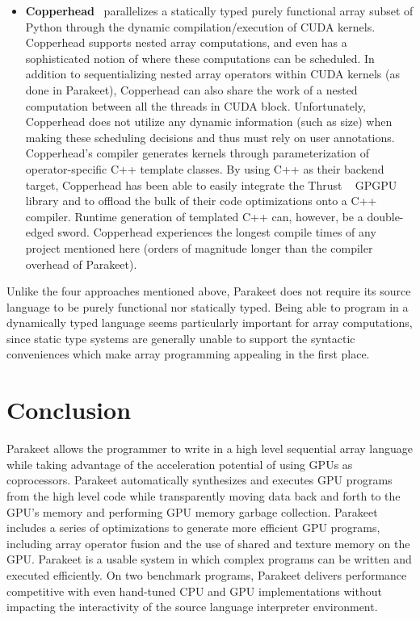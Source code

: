 \documentclass[preprint]{sigplanconf}
\begin{document}
\begin{itemize}
\item \textbf{Copperhead}~\cite{Cata11} parallelizes a statically typed purely functional array subset of Python through the dynamic compilation/execution of CUDA kernels. Copperhead supports nested array computations, and even has a sophisticated notion of where these computations can be scheduled. In addition
to sequentializing nested array operators within CUDA kernels (as done in Parakeet), Copperhead can also share the work of a nested computation between all the threads in CUDA block. Unfortunately, Copperhead does not utilize any dynamic information (such as size) when making these scheduling decisions and
thus must rely on user annotations. Copperhead's compiler generates kernels through parameterization of operator-specific C++ template classes. By using C++ as their backend target, Copperhead has been able to easily integrate the Thrust ~\cite{Hobe10} GPGPU library and to offload the bulk of their code optimizations onto a C++ compiler. Runtime generation of templated C++ can, however, be a double-edged sword. Copperhead experiences the longest compile times of any project mentioned here (orders of magnitude longer than the compiler overhead of Parakeet).
\end{itemize}
Unlike the four approaches mentioned above, Parakeet does not require its source language to be purely functional nor statically typed. Being able to program in a dynamically typed language seems particularly important for array computations, since static type systems are generally unable to support the syntactic conveniences which make array programming appealing in the first place.

\section{Conclusion}
\label{Conclusion}

Parakeet allows the programmer to write in a high level sequential array language while taking advantage of the acceleration potential of using GPUs as coprocessors. Parakeet automatically synthesizes and executes GPU programs from the high level code while transparently moving data back and forth to the GPU's memory and performing GPU memory garbage collection. Parakeet includes a series of optimizations to generate more efficient GPU programs, including array operator fusion and the use of shared and texture memory on the GPU.  Parakeet is a usable system in which complex programs can be written and executed efficiently.  On two benchmark programs, Parakeet delivers performance competitive with even hand-tuned CPU and GPU implementations without impacting the interactivity of the source language interpreter environment.
\end{document}
